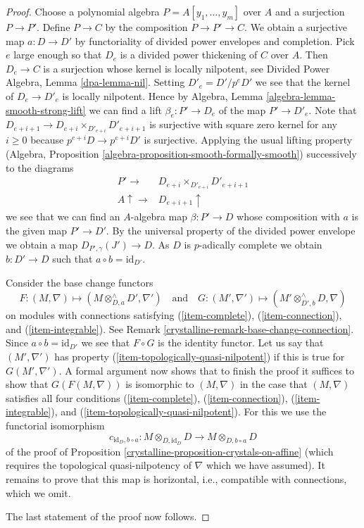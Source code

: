 \begin{proof}

Choose a polynomial algebra $P = A[y_1, \ldots, y_m]$ over $A$ and a
surjection $P \to P'$. Define $P \to C$ by the composition $P \to P' \to C$.
We obtain a surjective map $a : D \to D'$ by functoriality of
divided power envelopes and completion. Pick $e$ large enough so that
$D_e$ is a divided power
thickening of $C$ over $A$. Then $D_e \to C$ is a surjection whose kernel
is locally nilpotent, see Divided Power Algebra, Lemma \ref{dpa-lemma-nil}.
Setting $D'_e = D'/p^eD'$
we see that the kernel of $D_e \to D'_e$ is locally nilpotent.
Hence by Algebra, Lemma \ref{algebra-lemma-smooth-strong-lift}
we can find a lift $\beta_e : P' \to D_e$ of the map $P' \to D'_e$.
Note that $D_{e + i + 1} \to D_{e + i} \times_{D'_{e + i}} D'_{e + i + 1}$
is surjective with square zero kernel for any $i \geq 0$ because
$p^{e + i}D \to p^{e + i}D'$ is surjective. Applying the usual lifting
property (Algebra, Proposition \ref{algebra-proposition-smooth-formally-smooth})
successively to the diagrams
$$
\begin{array}{cc}P' \longrightarrow & D_{e + i} \times_{D'_{e + i}} D'_{e + i + 1} \\ A \uparrow\longrightarrow & D_{e + i + 1} \uparrow\end{array}
$$
we see that we can find an $A$-algebra map $\beta : P' \to D$ whose
composition with $a$ is the given map $P' \to D'$.
By the universal property of the divided power envelope we obtain a
map $D_{P', \gamma}(J') \to D$. As $D$ is $p$-adically complete we
obtain $b : D' \to D$ such that $a \circ b = \text{id}_{D'}$.

\medskip\noindent
Consider the base change functors
$$
F : (M, \nabla) \longmapsto
(M \otimes^\wedge_{D, a} D', \nabla')
\quad\text{and}\quad
G : (M', \nabla') \longmapsto
(M' \otimes^\wedge_{D', b} D, \nabla)
$$
on modules with connections satisfying (\ref{item-complete}),
(\ref{item-connection}), and (\ref{item-integrable}).
See Remark \ref{crystalline-remark-base-change-connection}.
Since $a \circ b = \text{id}_{D'}$ we see that
$F \circ G$ is the identity functor. Let us say that $(M', \nabla')$
has property (\ref{item-topologically-quasi-nilpotent}) if this
is true for $G(M', \nabla')$. A formal argument now shows that to finish
the proof it suffices to show that $G(F(M, \nabla))$ is isomorphic
to $(M, \nabla)$ in the case that $(M, \nabla)$ satisfies all four
conditions (\ref{item-complete}), (\ref{item-connection}),
(\ref{item-integrable}), and (\ref{item-topologically-quasi-nilpotent}).
For this we use the functorial isomorphism
$$
c_{\text{id}_D, b \circ a} :
M \otimes_{D, \text{id}_D} D
\longrightarrow
M \otimes_{D, b \circ a} D
$$
of the proof of Proposition \ref{crystalline-proposition-crystals-on-affine}
(which requires the topological quasi-nilpotency of $\nabla$
which we have assumed).
It remains to prove that this map is horizontal, i.e.,
compatible with connections, which we omit.

\medskip\noindent
The last statement of the proof now follows.
\end{proof}

